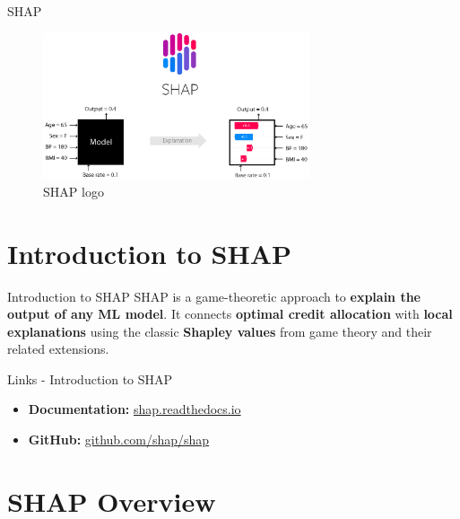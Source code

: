 \documentclass[aspectratio=169]{beamer}
\begin{document}
\begin{frame}{\ac{SHAP}}
    \begin{figure}[htbp]
        \centering
        \includegraphics[width=0.7\textwidth]{figs/shap/shap_header.png}
        \caption{\ac{SHAP} logo}
        \label{fig:shap}
    \end{figure}
\end{frame}

\section{Introduction to \ac{SHAP}}

\begin{frame}{Introduction to \ac{SHAP}}
    \ac{SHAP} is a game-theoretic approach to \textbf{explain the output of any \ac{ML} model}. It connects \textbf{optimal credit allocation} with \textbf{local explanations} using the classic \textbf{Shapley values} from game theory and their related extensions.
\end{frame}

\begin{frame}{Links - Introduction to \ac{SHAP}}
    \begin{itemize}
        \item \textbf{Documentation:} \url{shap.readthedocs.io}
        \item \textbf{GitHub:} \url{github.com/shap/shap}
    \end{itemize}
    
\end{frame}

\section{\ac{SHAP} Overview}
\end{document}
